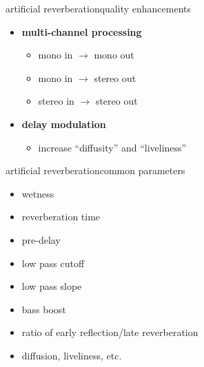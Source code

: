 \begin{frame}{artificial reverberation}{quality enhancements}
	\begin{itemize}
		\item	\textbf{multi-channel processing}
			\begin{itemize}
				\item	mono in $\rightarrow$ mono out				
				\item	mono in $\rightarrow$ stereo out				
				\item	stereo in $\rightarrow$ stereo out
			\end{itemize}
		\pause
        \bigskip
		\item	\textbf{delay modulation}
			\begin{itemize}
				\item	increase ``diffusity'' and ``liveliness''
			\end{itemize}
	\end{itemize}
\end{frame}

\begin{frame}{artificial reverberation}{common parameters}
	\begin{itemize}
		\item	wetness
		\pause
		\item	reverberation time
		\pause
		\item	pre-delay
		\pause
		\item	low pass cutoff
		\pause
		\item	low pass slope
		\pause
		\item	bass boost
		\pause
		\item	ratio of early reflection/late reverberation
		\pause
		\item	diffusion, liveliness, etc.
	\end{itemize}
\end{frame}
